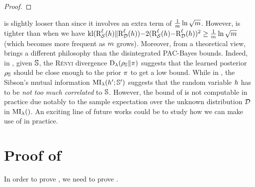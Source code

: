 \begin{noaddcontents}
\begin{proof}
\end{proof}
 is slightly looser than  since it involves an extra term of $\tfrac1m\ln\sqrt{\m}$.
However,  is tighter than  when we have $\kl(\RiskLoss_{\dS}(\h)\|\RiskLoss_{\D}(\h)){-}2(\RiskLoss_{\dS}(\h){-}\RiskLoss_{\D}(\h))^2 \ge \tfrac1m\ln\sqrt{\m}$ (which becomes more frequent as $\m$ grows).
Moreover, from a theoretical view,  brings a different philosophy than the disintegrated PAC-Bayes bounds. 
Indeed, in , given $\S$, the \textsc{Rényi} divergence  $\Renyi_{\lambda}(\AQ\|\P)$ suggests that the learned posterior $\AQ$ should be close enough to the prior $\P$  to get a low bound.
While in , the Sibson's mutual information $\MI_{\lambda}(\h'; \S')$ suggests that the random variable $\h$ has to be {\it not too much correlated} to $\S$.
However, the bound of  is not computable in practice due notably to the sample expectation over the unknown distribution $\D$ in $\MI_{\lambda}()$.
An exciting line of future works could be to study how we can make use of   in practice.

\section{Proof of }

In order to prove , we need to prove .


\end{noaddcontents}
